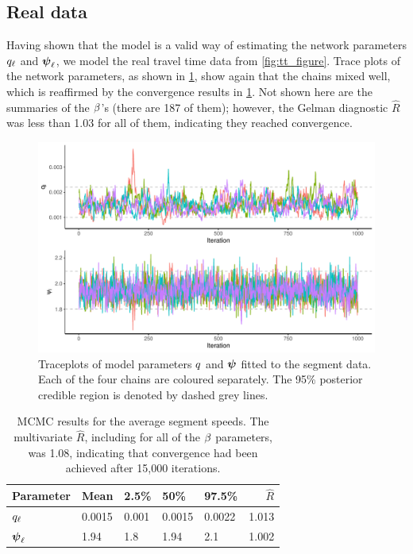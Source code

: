 \subsection{Real data}
\label{nw_par_est_real}



Having shown that the  model is a valid way of estimating the network parameters $q_\ell$ and $\mathbf{\boldsymbol{\psi}}_\ell$, we model the real travel time data from \cref{fig:tt_figure}. Trace plots of the network parameters, as shown in \cref{fig:nw_model_n1_view}, show again that the chains mixed well, which is reaffirmed by the convergence results in \cref{tab:nw_model_fit_smry}. Not shown here are the summaries of the $\beta$'s (there are 187 of them); however, the Gelman diagnostic $\hat R$ was less than 1.03 for all of them, indicating they reached convergence.

\begin{knitrout}\small
{}\color{fgcolor}\begin{figure}

{\centering \includegraphics[width=0.8\linewidth]{figure/nw_model_n1_view-1} 

}

\caption[Traceplots of model parameters fitted to the segment data]{Traceplots of model parameters $q$ and $\mathbf{\boldsymbol{\psi}}$ fitted to the segment data. Each of the four chains are coloured separately. The 95\% posterior credible region is denoted by dashed grey lines.}\label{fig:nw_model_n1_view}
\end{figure}


\end{knitrout}

\begin{table}

\caption{\label{tab:nw_model_fit_smry}MCMC results for the average segment speeds. The multivariate $\hat R$, including for all of the $\beta$ parameters, was 1.08, indicating that convergence had been achieved after 15,000 iterations.}
\centering
\begin{tabular}[b]{lllllr}
\toprule
Parameter & Mean & 2.5\% & 50\% & 97.5\% & $\hat R$\\
\midrule
$q_\ell$ & 0.0015 & 0.001 & 0.0015 & 0.0022 & 1.013\\
$\mathbf{\boldsymbol{\psi}}_\ell$ & 1.94 & 1.8 & 1.94 & 2.1 & 1.002\\
\bottomrule
\end{tabular}
\end{table}



